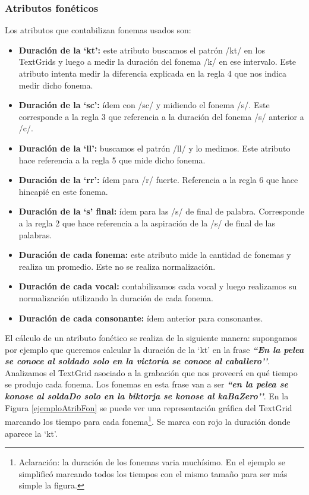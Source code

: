 \subsubsection{Atributos fonéticos}

Los atributos que contabilizan fonemas usados son:

\begin{itemize}
    \item \textbf{Duración de la `kt’:} este atributo buscamos el patrón /kt/ en los TextGrids y luego a medir la duración del fonema /k/ en ese intervalo. Este atributo intenta medir la diferencia explicada en la regla 4 que nos indica medir dicho fonema.
    \item \textbf{Duración de la `sc’:} ídem con /sc/ y midiendo el fonema /s/. Este corresponde a la regla 3 que referencia a la duración del fonema /s/ anterior a /c/.  
    \item \textbf{Duración de la `ll’:} buscamos el patrón /ll/ y lo medimos. Este atributo hace referencia a la regla 5 que mide dicho fonema.
    \item \textbf{Duración de la `rr’:} ídem para /r/ fuerte. Referencia a la regla 6 que hace hincapié en este fonema.
    \item \textbf{Duración de la `s’ final:} ídem para las /s/ de final de palabra. Corresponde a la regla 2 que hace referencia a la aspiración de la /s/ de final de las palabras.  
    \item \textbf{Duración de cada fonema:} este atributo mide la cantidad de fonemas y realiza un promedio. Este no se realiza normalización.  
    \item \textbf{Duración de cada vocal:} contabilizamos cada vocal y luego realizamos su normalización utilizando la duración de cada fonema.
    \item \textbf{Duración de cada consonante:} ídem anterior para consonantes. 
\end{itemize}

El cálculo de un atributo fonético se realiza de la siguiente manera: supongamos por ejemplo que queremos calcular la duración de la `kt’ en la frase \textbf{\textit{``En la pelea se conoce al soldado solo en la victoria se conoce al caballero’’}}. Analizamos el TextGrid asociado a la grabación que nos proveerá en qué tiempo se produjo cada fonema. Los fonemas en esta frase van a ser \textbf{\textit{``en la pelea se konose al soldaDo solo en la biktorja se konose al kaBaZero’’}}. En la Figura \ref{ejemploAtribFon} se puede ver una representación gráfica del TextGrid marcando los tiempo para cada fonema\footnote{Aclaración: la duración de los fonemas varia muchísimo. En el ejemplo se simplificó marcando todos los tiempos con el mismo tamaño para ser más simple la figura.}. Se marca con rojo la duración donde aparece la `kt’.

